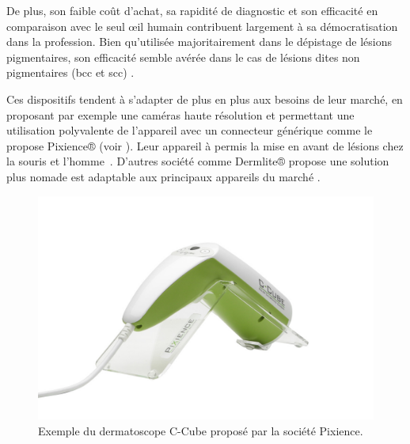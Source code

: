 De plus, son faible coût d’achat, sa rapidité de diagnostic et son efficacité en comparaison avec le seul œil humain \cite{Lallas2013} contribuent largement à sa démocratisation dans la profession. Bien qu’utilisée majoritairement dans le dépistage de lésions pigmentaires, son efficacité semble avérée dans le cas de lésions dites non pigmentaires (\gls{bcc} et \gls{scc}) \cite{Lallas2013}. 

Ces dispositifs tendent à s'adapter de plus en plus aux besoins de leur marché, en proposant par exemple une caméras haute résolution et permettant une utilisation polyvalente de l'appareil avec un connecteur générique comme le propose Pixience® (voir ). Leur appareil à permis la mise en avant de lésions chez la souris et l'homme~\cite{Cinotti2016,Pillon2017}. D'autres société comme Dermlite® propose une solution plus nomade est adaptable aux principaux appareils du marché .\par

\begin{figure}[H]
    \centering
    \includegraphics[width=0.60\linewidth]{contents/chapter_2/resources/example_device_ccube.jpg}
    \caption{Exemple du dermatoscope C-Cube proposé par la société Pixience.}
    \label{fig:example_device_ccube}
\end{figure}\par

